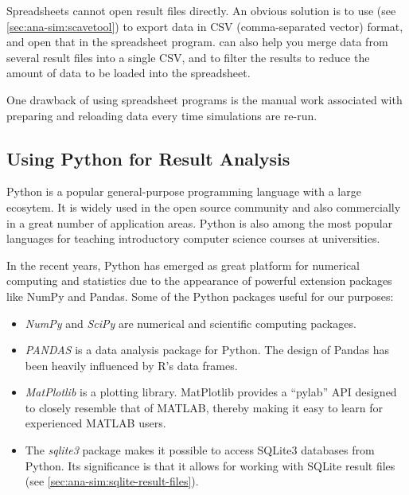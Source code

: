Spreadsheets cannot open result files directly. An obvious solution is to use
 (see \ref{sec:ana-sim:scavetool}) to export data in CSV
(comma-separated vector) format, and open that in the spreadsheet program.
 can also help you merge data from several result
files into a single CSV, and to filter the results to reduce the amount
of data to be loaded into the spreadsheet.

One drawback of using spreadsheet programs is the manual work associated
with preparing and reloading data every time simulations are re-run.


\subsection{Using Python for Result Analysis}
\label{sec:ana-sim:using-python}

Python is a popular general-purpose programming language with a large ecosytem.
It is widely used in the open source community and also commercially in a great
number of application areas. Python is also among the most popular languages
for teaching introductory computer science courses at universities.

In the recent years, Python has emerged as great platform for numerical
computing and statistics due to the appearance of powerful extension packages
like NumPy and Pandas. Some of the Python packages useful for our purposes:

\begin{itemize}
  \item \textit{NumPy} and \textit{SciPy} are numerical and scientific computing
    packages.

  \item \textit{PANDAS} is a data analysis package for Python. The design of
    Pandas has been heavily influenced by R's data frames.

  \item \textit{MatPlotlib} is a plotting library. MatPlotlib provides a
    ``pylab'' API designed to closely resemble that of MATLAB, thereby making
    it easy to learn for experienced MATLAB users.

  \item The \textit{sqlite3} package makes it possible to access SQLite3
    databases from Python. Its significance is that it allows for working
    with {\opp} SQLite result files (see \ref{sec:ana-sim:sqlite-result-files}).

\end{itemize}


